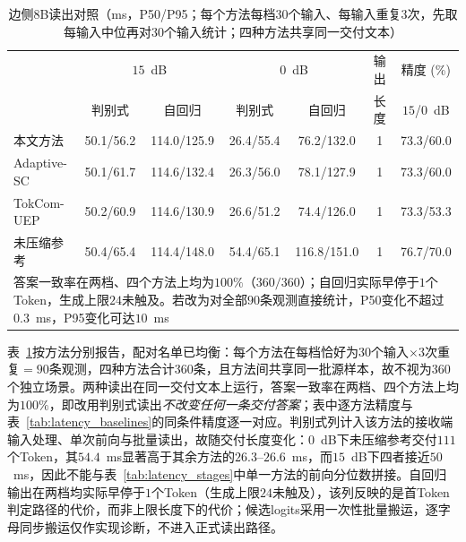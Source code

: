 \documentclass[journal]{IEEEtran}
\begin{document}
\begin{table}[t]
\centering
\small
\caption{边侧8B读出对照（ms，P50/P95；每个方法每档$30$个输入、每输入重复$3$次，先取每输入中位再对$30$个输入统计；四种方法共享同一交付文本）}
\label{tab:latency_readout}
\renewcommand{\arraystretch}{1.05}
\begin{tabular}{lcccccc}
\hline
 & \multicolumn{2}{c}{$15$~dB} & \multicolumn{2}{c}{$0$~dB} & 输出 & 精度 (\%)\\
 & 判别式 & 自回归 & 判别式 & 自回归 & 长度 & $15$/$0$~dB\\
\hline
本文方法 & 50.1/56.2 & 114.0/125.9 & 26.4/55.4 & 76.2/132.0 & 1 & 73.3/60.0\\
Adaptive-SC & 50.1/61.7 & 114.6/132.4 & 26.3/56.0 & 78.1/127.9 & 1 & 73.3/60.0\\
TokCom-UEP & 50.2/60.9 & 114.6/130.9 & 26.6/51.2 & 74.4/126.0 & 1 & 73.3/53.3\\
未压缩参考 & 50.4/65.4 & 114.4/148.0 & 54.4/65.1 & 116.8/151.0 & 1 & 76.7/70.0\\
\hline
\multicolumn{7}{p{0.95\textwidth}}{答案一致率在两档、四个方法上均为$100\%$（$360/360$）；自回归实际早停于$1$个Token，生成上限$24$未触及。若改为对全部$90$条观测直接统计，P50变化不超过$0.3$~ms，P95变化可达$10$~ms}\\
\hline
\end{tabular}
\end{table}

表~\ref{tab:latency_readout}按方法分别报告，配对名单已均衡：每个方法在每档恰好为$30$个输入$\times3$次重复$=90$条观测，四种方法合计$360$条，且方法间共享同一批源样本，故不视为$360$个独立场景。两种读出在同一交付文本上运行，答案一致率在两档、四个方法上均为$100\%$，即改用判别式读出\emph{不改变任何一条交付答案}；表中逐方法精度与表~\ref{tab:latency_baselines}的同条件精度逐一对应。判别式列计入该方法的接收端输入处理、单次前向与批量读出，故随交付长度变化：$0$~dB下未压缩参考交付$111$个Token，其$54.4$~ms显著高于其余方法的$26.3$--$26.6$~ms，而$15$~dB下四者接近$50$~ms，因此不能与表~\ref{tab:latency_stages}中单一方法的前向分位数拼接。自回归输出在两档均实际早停于$1$个Token（生成上限$24$未触及），该列反映的是首Token判定路径的代价，而非上限长度下的代价；候选logits采用一次性批量搬运，逐字母同步搬运仅作实现诊断，不进入正式读出路径。
\end{document}
